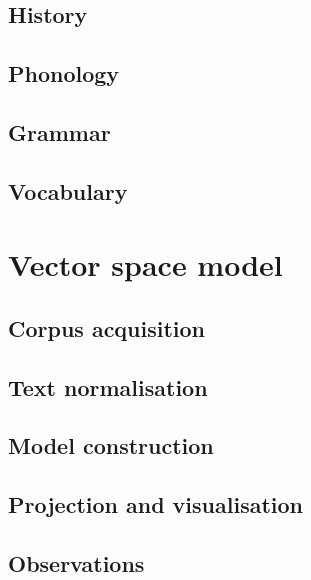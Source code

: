 \documentclass[14pt, a4paper]{extreport}
\begin{document}
\subsection{History}

\subsection{Phonology}

\subsection{Grammar}

\subsection{Vocabulary}

\section{Vector space model}

\subsection{Corpus acquisition}

\subsection{Text normalisation}

\subsection{Model construction}

\subsection{Projection and visualisation}

\subsection{Observations}

%
%
\end{document}
